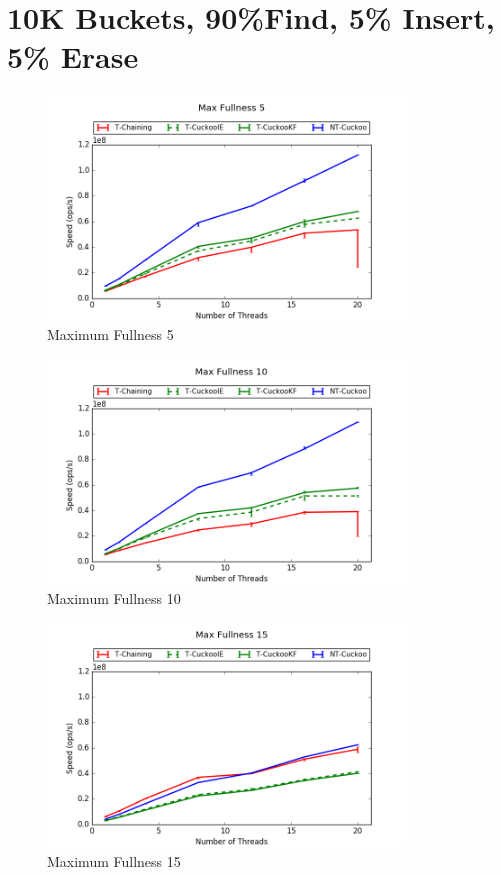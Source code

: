 \section{10K Buckets, 90\%Find, 5\% Insert, 5\% Erase}
\begin{figure}[H]
    \centering
	\includegraphics[width=0.85\textwidth]{maps/5HM10K:F90,I5,E5.png} 
        \caption*{Maximum Fullness 5}
    \end{figure}
\begin{figure}[H]
    \centering
	\includegraphics[width=0.85\textwidth]{maps/10HM10K:F90,I5,E5.png} 
        \caption*{Maximum Fullness 10}
    \end{figure}
\begin{figure}[H]
    \centering
	\includegraphics[width=0.85\textwidth]{maps/15HM1M:F90,I5,E5.png} 
        \caption*{Maximum Fullness 15}
    \end{figure}

